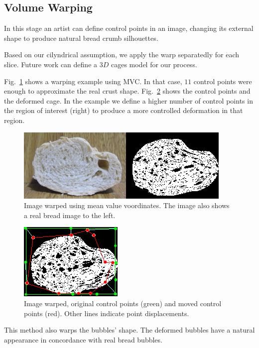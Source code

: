 \documentclass[final,5p,times]{elsarticle}
\begin{document}
{%
\subsection{Volume Warping}
In this stage an artist can define control points in an image, changing its external shape to produce natural bread crumb silhouettes. 


Based on our cilyndrical assumption, we apply the warp separatedly for each slice. Future work can define a $3D$ cages model for our process.


Fig.~\ref{FigMVC} shows a warping example using MVC. In that case, $11$ control points were enough to approximate the real crust shape. Fig.~\ref{FigMVCpoints} shows the control points and the deformed cage. In the example we define a higher number of control points in the region of interest (right) to produce a more controlled deformation in that region.

\begin{figure}[!ht]
\includegraphics[scale=0.65]{warping.png}
\caption{Image warped using mean value voordinates. The image also shows a real bread image to the left. }
\label{FigMVC}
\end{figure}


\begin{figure}[!ht]
\includegraphics[scale=1.35]{warppoints.png}
\caption{Image warped, original control points (green) and moved control points (red). Other lines indicate point displacements. }
\label{FigMVCpoints}
\end{figure}


This method also warps the bubbles' shape. The deformed bubbles have a natural appearance in concordance with real bread bubbles. 


}
\end{document}
